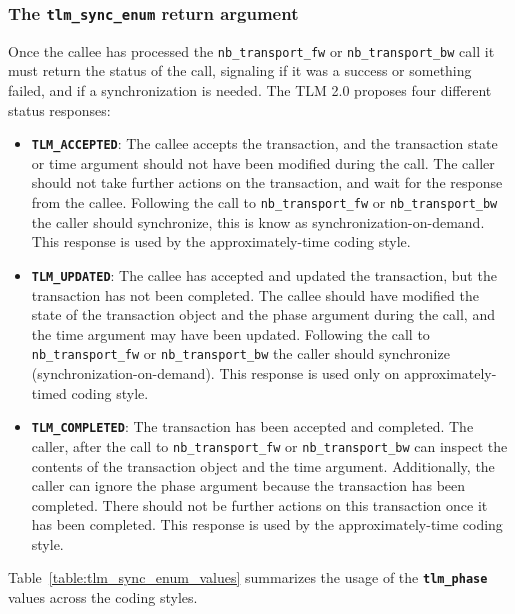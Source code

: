 {\subsubsection{The \texttt{tlm\_sync\_enum} return argument}
Once the callee has processed the \texttt{nb\_transport\_fw} or \texttt{nb\_transport\_bw} call it must return the status of the call, signaling if it was a success or something failed, and if a synchronization is needed.
The TLM 2.0 proposes four different status responses:
\begin{itemize}
	\item \texttt{\textbf{TLM\_ACCEPTED}}: The callee accepts the transaction, and the transaction state or time argument should not have been modified during the call.
	The caller should not take further actions on the transaction, and wait for the response from the callee.
	Following the call to \texttt{nb\_transport\_fw} or \texttt{nb\_transport\_bw} the caller should synchronize, this is know as synchronization-on-demand.
	This response is used by the approximately-time coding style.
	\item \texttt{\textbf{TLM\_UPDATED}}: The callee has accepted and updated the transaction, but the transaction has not been completed.
	The callee should have modified the state of the transaction object and the phase argument during the call, and the time argument may have been updated.
	Following the call to \texttt{nb\_transport\_fw} or \texttt{nb\_transport\_bw} the caller should synchronize (synchronization-on-demand).
	This response is used only on approximately-timed coding style.
	\item \texttt{\textbf{TLM\_COMPLETED}}: The transaction has been accepted and completed.
	The caller, after the call to \texttt{nb\_transport\_fw} or \texttt{nb\_transport\_bw} can inspect the contents of the transaction object and the time argument.
	Additionally, the caller can ignore the phase argument because the transaction has been completed.
	There should not be further actions on this transaction once it has been completed.
	This response is used by the approximately-time coding style.
\end{itemize}
Table~\ref{table:tlm_sync_enum_values} summarizes the usage of the \texttt{\textbf{tlm\_phase}} values across the coding styles.

}
